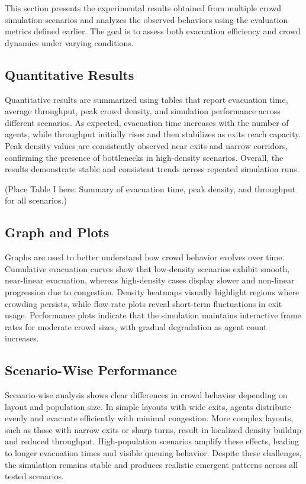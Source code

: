 \documentclass[conference]{IEEEtran}
\begin{document}
This section presents the experimental results obtained from multiple crowd
simulation scenarios and analyzes the observed behaviors using the evaluation
metrics defined earlier. The goal is to assess both evacuation efficiency and
crowd dynamics under varying conditions.

\subsection{\textbf{Quantitative Results}}

Quantitative results are summarized using tables that report evacuation time,
average throughput, peak crowd density, and simulation performance across
different scenarios. As expected, evacuation time increases with the number of
agents, while throughput initially rises and then stabilizes as exits reach
capacity. Peak density values are consistently observed near exits and narrow
corridors, confirming the presence of bottlenecks in high-density scenarios.
Overall, the results demonstrate stable and consistent trends across repeated
simulation runs.

(Place Table I here: Summary of evacuation time, peak density, and throughput for all scenarios.)

\subsection{\textbf{Graph and Plots}}

Graphs are used to better understand how crowd behavior evolves over time.
Cumulative evacuation curves show that low-density scenarios exhibit smooth,
near-linear evacuation, whereas high-density cases display slower and
non-linear progression due to congestion. Density heatmaps visually highlight
regions where crowding persists, while flow-rate plots reveal short-term
fluctuations in exit usage. Performance plots indicate that the simulation
maintains interactive frame rates for moderate crowd sizes, with gradual
degradation as agent count increases.

\subsection{\textbf{Scenario-Wise Performance}}

Scenario-wise analysis shows clear differences in crowd behavior depending on
layout and population size. In simple layouts with wide exits, agents
distribute evenly and evacuate efficiently with minimal congestion. More
complex layouts, such as those with narrow exits or sharp turns, result in
localized density buildup and reduced throughput. High-population scenarios
amplify these effects, leading to longer evacuation times and visible queuing
behavior. Despite these challenges, the simulation remains stable and produces
realistic emergent patterns across all tested scenarios.
\end{document}
